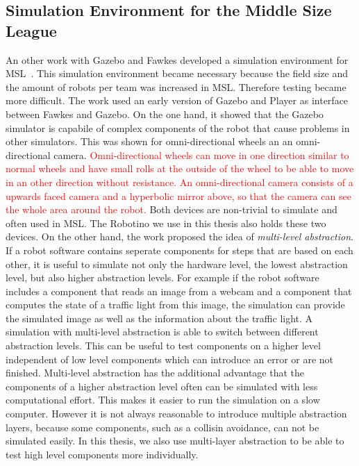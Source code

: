 \subsection{Simulation Environment for the Middle Size League}
An other work with Gazebo and Fawkes developed a simulation environment for MSL~\cite{MultiLevelAbstraction}. This simulation environment became necessary because the field size and the amount of robots per team was increased in MSL. Therefore testing became more difficult. The work used an early version of Gazebo and Player as interface between Fawkes and Gazebo. On the one hand, it showed that the Gazebo simulator is capabile of complex components of the robot that cause problems in other simulators. This was shown for omni-directional wheels an an omni-directional camera. \textcolor{red}{Omni-directional wheels can move in one direction similar to normal wheels and have small rolls at the outside of the wheel to be able to move in an other direction without resistance. An omni-directional camera consists of a upwards faced camera and a hyperbolic mirror above, so that the camera can see the whole area around the robot.} Both devices are non-trivial to simulate and often used in MSL. The Robotino we use in this thesis also holds these two devices. On the other hand, the work proposed the idea of \textit{multi-level abstraction}. If a robot software contains seperate components for steps that are based on each other, it is useful to simulate not only the hardware level, the lowest abstraction level, but also higher abstraction levels. For example if the robot software includes a component that reads an image from a webcam and a component that computes the state of a traffic light from this image, the simulation can provide the simulated image as well as the information about the traffic light. A simulation with multi-level abstraction is able to switch between different abstraction levels. This can be useful to test components on a higher level independent of low level components which can introduce an error or are not finished. Multi-level abstraction has the additional advantage that the components of a higher abstraction level often can be simulated with less computational effort. This makes it easier to run the simulation on a slow computer. However it is not always reasonable to introduce multiple abstraction layers, because some components, such as a collisin avoidance, can not be simulated easily. In this thesis, we also use multi-layer abstraction to be able to test high level components more individually.


